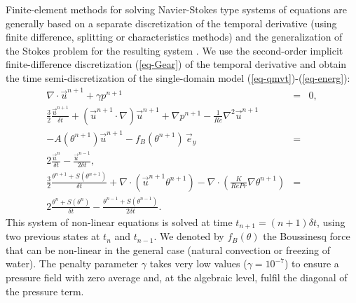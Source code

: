 Finite-element methods for solving Navier-Stokes type systems of equations  are generally based on a separate discretization of the temporal derivative (using finite difference, splitting or characteristics methods) and the generalization of the Stokes problem for the resulting system \citep{Temam,GRaviart,Quarteroni}. We use the second-order implicit finite-difference discretization (\ref{eq-Gear}) of the temporal derivative and obtain the time semi-discretization of the single-domain model (\ref{eq-qmvt})-(\ref{eq-energ}):
\begin{eqnarray} \label{eq-time-disc1}
\nabla\cdot \vec{u}^{n+1} + {\gamma} p^{n+1} &=& 0, \\ \nonumber
\frac{3}{2} \frac{\vec{u}^{n+1}}{\delta t} +(\vec{u}^{n+1}\cdot\nabla) \vec{u}^{n+1} +\nabla p^{n+1} 
- {\frac{1}{Re} \nabla^2 \vec u^{n+1}}  & & \\ \nonumber 
- A(\theta^{n+1})\vec u^{n+1}- f_B(\theta^{n+1}) \, \vec{e}_y &=&  \\
2 \frac{\vec{u}^{n}}{\delta t}-\frac{\vec{u}^{n-1}}{2\delta t},\\ \nonumber
\frac{3}{2} \frac{\theta^{n+1} + S(\theta^{n+1})}{\delta t} +
\nabla\cdot\left(\vec{u}^{n+1} \theta^{n+1}\right)
- \nabla \cdot\left( \frac{K}{RePr} \nabla \theta^{n+1} \right) &=& \\ \label{eq-time-disc3}
2\frac{ \theta^{n} + S(\theta^{n})}{\delta t}-\frac{ \theta^{n-1} + S(\theta^{n-1}) }{2\delta t}.
\end{eqnarray}
This system of non-linear equations is solved at time  $t_{n+1}=(n+1) \delta t$, using two  previous states at $t_{n}$ and $t_{n-1}$.  We denoted by $f_B(\theta)$ the Boussinesq force that can be non-linear in the general case (\eg natural convection or freezing of water). The penalty parameter $\gamma$ 
takes very low values ($\gamma=10^{-7}$)  to ensure a pressure field with zero average and, at the algebraic level, fulfil the diagonal of the pressure term.  



